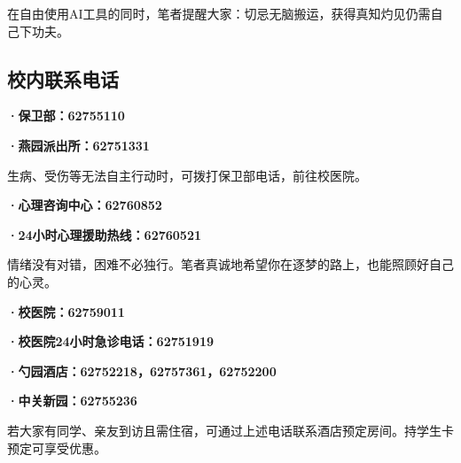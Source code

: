 在自由使用AI工具的同时，笔者提醒大家：切忌无脑搬运，获得真知灼见仍需自己下功夫。

\subsection{校内联系电话}

\textbf{·保卫部：62755110}

\textbf{·燕园派出所：62751331}

生病、受伤等无法自主行动时，可拨打保卫部电话，前往校医院。

\vspace{10pt}

\textbf{·心理咨询中心：62760852}

\textbf{·24小时心理援助热线：62760521}

情绪没有对错，困难不必独行。笔者真诚地希望你在逐梦的路上，也能照顾好自己的心灵。

\vspace{10pt}

\textbf{·校医院：62759011}

\textbf{·校医院24小时急诊电话：62751919}

\vspace{10pt}

\textbf{·勺园酒店：62752218，62757361，62752200}

\textbf{·中关新园：62755236}

若大家有同学、亲友到访且需住宿，可通过上述电话联系酒店预定房间。持学生卡预定可享受优惠。
